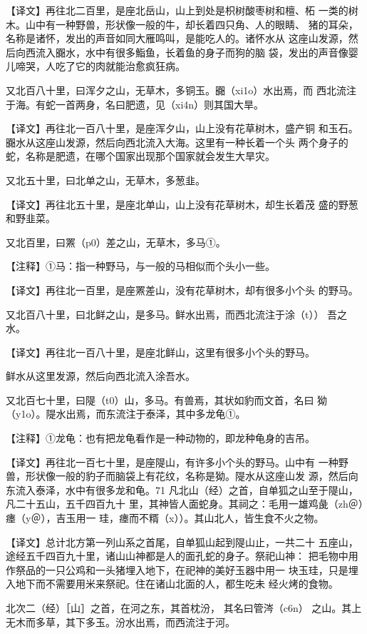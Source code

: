 \documentclass[a4paper,12pt,UTF8,twoside]{ctexbook}
\begin{document}
【译文】再往北二百里，是座北岳山，山上到处是枳树酸枣树和檀、柘 一类的树木。山中有一种野兽，形状像一般的牛，却长着四只角、人的眼睛、 猪的耳朵，名称是诸怀，发出的声音如同大雁鸣叫，是能吃人的。诸怀水从 这座山发源，然后向西流入嚻水，水中有很多鮨鱼，长着鱼的身子而狗的脑 袋，发出的声音像婴儿啼哭，人吃了它的肉就能治愈疯狂病。

又北百八十里，曰浑夕之山，无草木，多铜玉。嚻（xi1o）水出焉，而 西北流注于海。有蛇一首两身，名曰肥遗，见（xi4n）则其国大旱。

【译文】再往北一百八十里，是座浑夕山，山上没有花草树木，盛产铜 和玉石。嚻水从这座山发源，然后向西北流入大海。这里有一种长着一个头 两个身子的蛇，名称是肥遗，在哪个国家出现那个国家就会发生大旱灾。

又北五十里，曰北单之山，无草木，多葱韭。

【译文】再往北五十里，是座北单山，山上没有花草树木，却生长着茂 盛的野葱和野韭菜。

又北百里，曰罴（p0）差之山，无草木，多马①。

【注释】①马：指一种野马，与一般的马相似而个头小一些。

【译文】再往北一百里，是座罴差山，没有花草树木，却有很多小个头 的野马。

又北百八十里，曰北鲜之山，是多马。鲜水出焉，而西北流注于涂（t）） 吾之水。

【译文】再往北一百八十里，是座北鲜山，这里有很多小个头的野马。

鲜水从这里发源，然后向西北流入涂吾水。

又北百七十里，曰隄（t0）山，多马。有兽焉，其状如豹而文首，名曰 狕（y1o）。隄水出焉，而东流注于泰泽，其中多龙龟①。

【注释】①龙龟：也有把龙龟看作是一种动物的，即龙种龟身的吉吊。

【译文】再往北一百七十里，是座隄山，有许多小个头的野马。山中有 一种野兽，形状像一般的豹子而脑袋上有花纹，名称是狕。隄水从这座山发 源，然后向东流入泰泽，水中有很多龙和龟。71 凡北山（经）之首，自单狐之山至于隄山，凡二十五山，五千四百九十 里，其神皆人面蛇身。其祠之：毛用一雄鸡彘（zh＠）瘗（y＠），吉玉用一 珪，瘗而不糈（x））。其山北人，皆生食不火之物。

【译文】总计北方第一列山系之首尾，自单狐山起到隄山止，一共二十 五座山，途经五千四百九十里，诸山山神都是人的面孔蛇的身子。祭祀山神： 把毛物中用作祭品的一只公鸡和一头猪埋入地下，在祀神的美好玉器中用一 块玉珪，只是埋入地下而不需要用米来祭祀。住在诸山北面的人，都生吃未 经火烤的食物。

北次二（经）［山］之首，在河之东，其首枕汾， 其名曰管涔（c6n） 之山。其上无木而多草，其下多玉。汾水出焉，而西流注于河。
\end{document}
